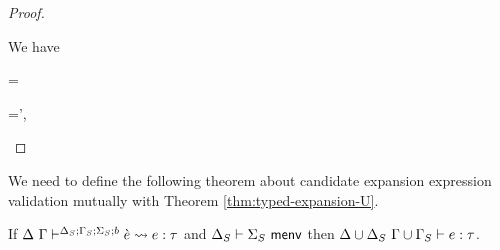 \begin{proof}
\begin{byCases}
\item[\text{(\ref{rule:expandsU-tsmap})}] We have 
\begin{pfsteps}
  \item \ue= 
  \item \Sigma=\Sigma',  
  \item {} 
  \item {} 
  \item \decodeCondE{\ecand}{\ce} 
  \item {} 
  \item \macenvOK{\Delta}{\Sigma}  
  \item {} 
\end{pfsteps}
\resetpfcounter
\end{byCases}
\end{proof}
We need to define the following theorem about candidate expansion expression validation mutually with Theorem \ref{thm:typed-expansion-U}. 
\begin{theorem}\label{thm:candidate-expansion-validation-U}
If $\Delta~\Gamma\vdash^{\Delta_S; \Gamma_S; \Sigma_S; b} \grave{e} \leadsto e : \tau$ and $\Delta_S \vdash \Sigma_S~\mathsf{menv}$ then $\Delta \cup \Delta_S~\Gamma \cup \Gamma_S \vdash e : \tau$.
\end{theorem}
